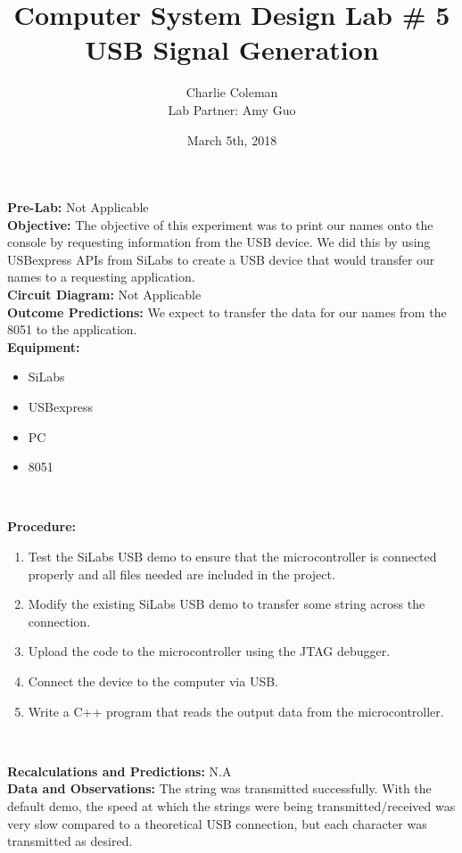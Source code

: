 \documentclass{article}
\title{Computer System Design Lab \# 5\\USB Signal Generation}
\author{Charlie Coleman \\ Lab Partner: Amy Guo}
\date{March 5th, 2018}
\newcommand{\sect}[1]{\noindent\textbf{#1}}
\begin{document}
\maketitle
\pagebreak

\sect{Pre-Lab:} Not Applicable\\

\sect{Objective:} The objective of this experiment was to print our names onto the console by requesting information from the USB device. We did this by using USBexpress APIs from SiLabs to create a USB device that would transfer our names to a requesting application.\\

\sect{Circuit Diagram:} Not Applicable\\

\sect{Outcome Predictions:} We expect to transfer the data for our names from the 8051 to the application.\\

\sect{Equipment:}

\begin{itemize}[noitemsep, nolistsep]
	\item SiLabs
	\item USBexpress
	\item PC
	\item 8051
\end{itemize}~

\sect{Procedure:}

\begin{enumerate}
	\item Test the SiLabs USB demo to ensure that the microcontroller is connected properly and all files needed are included in the project.
	\item Modify the existing SiLabs USB demo to transfer some string across the connection.
	\item Upload the code to the microcontroller using the JTAG debugger.
	\item Connect the device to the computer via USB.
	\item Write a C++ program that reads the output data from the microcontroller.
\end{enumerate}~

\sect{Recalculations and Predictions:} N.A\\

\sect{Data and Observations:} The string was transmitted successfully. With the default demo, the speed at which the strings were being transmitted/received was very slow compared to a theoretical USB connection, but each character was transmitted as desired.\\
\end{document}
